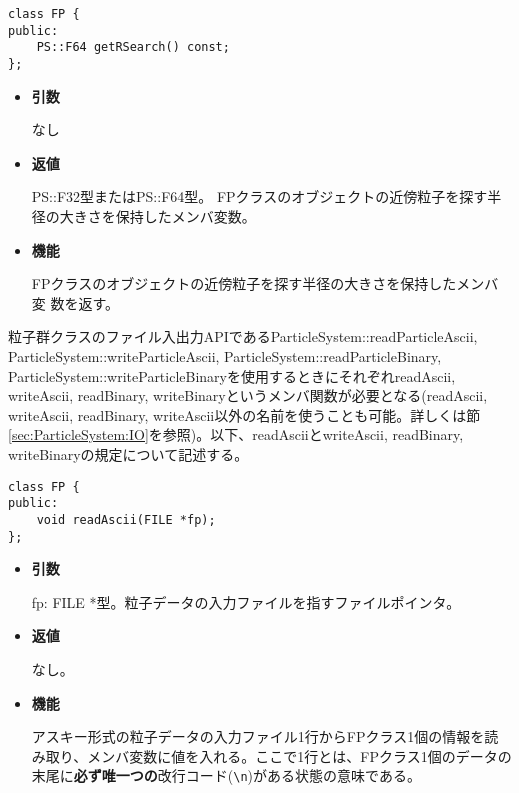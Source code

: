 \begin{screen}
\begin{verbatim}
class FP {
public:
    PS::F64 getRSearch() const;
};
\end{verbatim}
\end{screen}

\begin{itemize}

\item {\bf 引数}

  なし
  
\item {\bf 返値}

  PS::F32型またはPS::F64型。 FPクラスのオブジェクトの近傍粒子を探す半
  径の大きさを保持したメンバ変数。
  
\item {\bf 機能}

  FPクラスのオブジェクトの近傍粒子を探す半径の大きさを保持したメンバ変
  数を返す。

\end{itemize}

\label{sec:userdefined_fullparticle_io}

粒子群クラスのファイル入出力APIであるParticleSystem::readParticleAscii, ParticleSystem::writeParticleAscii, ParticleSystem::readParticleBinary, ParticleSystem::writeParticleBinaryを使用するときにそれぞれreadAscii, writeAscii, readBinary, writeBinaryというメンバ関数が必要となる(readAscii, writeAscii, readBinary, writeAscii以外の名前を使うことも可能。詳しくは節\ref{sec:ParticleSystem:IO}を参照)。以下、readAsciiとwriteAscii, readBinary, writeBinaryの規定について記述する。

\label{sec:FP_readAscii}

\begin{screen}
\begin{verbatim}
class FP {
public:
    void readAscii(FILE *fp);
};
\end{verbatim}
\end{screen}

\begin{itemize}

\item {\bf 引数}

  fp: FILE *型。粒子データの入力ファイルを指すファイルポインタ。
  
\item {\bf 返値}

  なし。
  
\item {\bf 機能}

  アスキー形式の粒子データの入力ファイル1行からFPクラス1個の情報を読み取り、メンバ変数に値を入れる。ここで1行とは、FPクラス1個のデータの末尾に\textbf{必ず唯一つの}改行コード(\texttt{\textbackslash n})がある状態の意味である。
\end{itemize}

